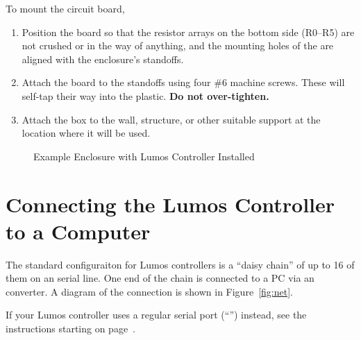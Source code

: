 \documentclass[letterpaper,twoside,onecolumn,openright,final]{memoir}
\begin{document}
To mount the circuit board,
\begin{enumerate}
	\item Position the board so that the resistor arrays on the bottom side
		(R0--R5) are not crushed or in the way of anything, and the mounting
		holes of the  are aligned with the enclosure's standoffs.
	\item Attach the board to the standoffs using four \#6 machine screws.  These will
		self-tap their way into the plastic. {\bfseries Do not over-tighten.}
	\item Attach the box to the wall, structure, or other suitable support at the location
		where it will be used.
\end{enumerate}
\begin{figure}
	\centerline{}
	\caption{Example Enclosure with Lumos Controller Installed}
\end{figure}

\section{Connecting the Lumos Controller to a Computer}
The standard configuraiton for Lumos controllers is a ``daisy chain'' of up to 16 of them on an 
serial line.  One end of the chain is connected to a PC via an  converter. 
A diagram of the  connection is shown in Figure~\ref{fig:net}.  


If your Lumos controller uses a regular serial port (``'') instead, see the instructions starting on page~\pageref{sec:rs232}.

%
%
\end{document}
